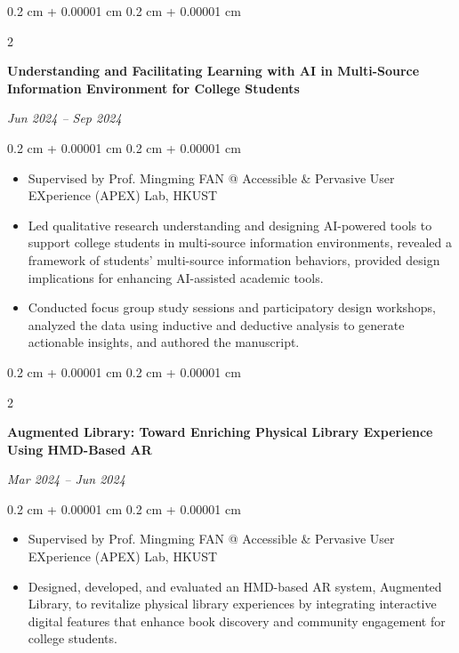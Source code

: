 \documentclass[10pt, letterpaper]{article}
\newenvironment{highlights}{
    \begin{itemize}[
        topsep=0.10 cm,
        parsep=0.10 cm,
        partopsep=0pt,
        itemsep=0pt,
        leftmargin=0.4 cm + 10pt
    ]
}{
    \end{itemize}
} %
\newenvironment{onecolentry}{
    \begin{adjustwidth}{
        0.2 cm + 0.00001 cm
    }{
        0.2 cm + 0.00001 cm
    }
}{
    \end{adjustwidth}
} %
\newenvironment{twocolentry}[2][]{
    \onecolentry
    \def\secondColumn{#2}
    \setcolumnwidth{\fill, 4.5 cm}
    \begin{paracol}{2}
}{
    \switchcolumn \raggedleft \secondColumn
    \end{paracol}
    \endonecolentry
} %
\begin{document}
        \begin{twocolentry}{
        \textit{Jun 2024 – Sep 2024}}
            \textbf{Understanding and Facilitating Learning with AI in Multi-Source Information Environment for College Students}
        \end{twocolentry}

        \vspace{0.10 cm}
        \begin{onecolentry}
            \begin{highlights}
                \item Supervised by Prof. Mingming FAN @ Accessible \& Pervasive User EXperience (APEX) Lab, HKUST
                \item Led qualitative research understanding and designing AI-powered tools to support college students in multi-source information environments, revealed a framework of students' multi-source information behaviors, provided design implications for enhancing AI-assisted academic tools.
                \item Conducted focus group study sessions and participatory design workshops, analyzed the data using inductive and deductive analysis to generate actionable insights, and authored the manuscript.
            \end{highlights}
        \end{onecolentry}

        \vspace{0.2 cm}

        \begin{twocolentry}{
        \textit{Mar 2024 – Jun 2024}}
            \textbf{Augmented Library: Toward Enriching Physical Library Experience Using HMD-Based AR}
        \end{twocolentry}

        \vspace{0.10 cm}
        \begin{onecolentry}
            \begin{highlights}
                \item Supervised by Prof. Mingming FAN @ Accessible \& Pervasive User EXperience (APEX) Lab, HKUST
                \item Designed, developed, and evaluated an HMD-based AR system, Augmented Library, to revitalize physical library experiences by integrating interactive digital features that enhance book discovery and community engagement for college students.
            \end{highlights}
        \end{onecolentry}
\end{document}
